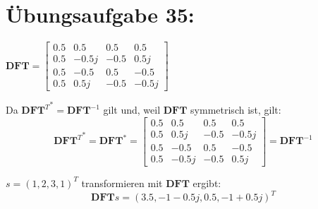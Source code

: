 

	\section*{Übungsaufgabe 35:}

    $
    \textbf{DFT} = \begin{bmatrix}
        0.5 & 0.5  & 0.5   &  0.5 \\
        0.5 & -0.5j & -0.5 &  0.5j \\
        0.5 & -0.5 & 0.5   & -0.5 \\
        0.5 & 0.5j & -0.5  & -0.5j
    \end{bmatrix}$

    Da ${\textbf{DFT}^T}^{*} = \textbf{DFT}^{-1}$ gilt und, weil $\textbf{DFT}$ symmetrisch ist, gilt:
    \[{\textbf{DFT}^T}^{*} = \textbf{DFT}^{*} = \begin{bmatrix}
        0.5 & 0.5   & 0.5  &  0.5 \\
        0.5 & 0.5j  & -0.5 & -0.5j \\
        0.5 & -0.5  & 0.5  & -0.5 \\
        0.5 & -0.5j & -0.5 & 0.5j
    \end{bmatrix} = \textbf{DFT}^{-1}\]

    $s = (1, 2, 3, 1)^T$ transformieren mit $\textbf{DFT}$ ergibt:
    \[
        \textbf{DFT}s = (3.5, -1 - 0.5j, 0.5, -1 + 0.5j)^T
    \]

